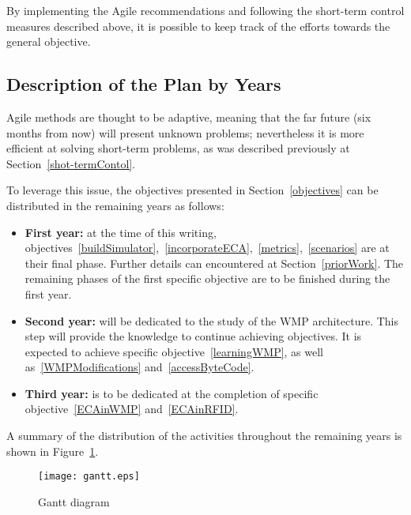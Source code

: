 By implementing the Agile recommendations and following the short-term control measures described above, it is possible to keep track of the efforts towards the general objective.

\subsection{Description of the Plan by Years}
Agile methods are thought to be adaptive, meaning that the far future (six months from now) will present unknown problems; nevertheless it is more efficient at solving short-term problems, as was described previously at Section~\ref{shot-termContol}.

To leverage this issue, the objectives presented in Section~\ref{objectives} can be distributed in the remaining years as follows:

\begin{itemize}
	\item {\bfseries First year:} at the time of this writing, objectives~\ref{buildSimulator},~\ref{incorporateECA},~\ref{metrics},~\ref{scenarios} are at their final phase. Further details can encountered at Section~\ref{priorWork}. The remaining phases of the first specific objective are to be finished during the first year.
	\item {\bfseries Second year:} will be dedicated to the study of the WMP architecture. This step will provide the knowledge to continue achieving objectives. It is expected to achieve specific objective~\ref{learningWMP}, as well as~\ref{WMPModifications} and~\ref{accessByteCode}.
	\item {\bfseries Third year:} is to be dedicated at the completion of specific objective~\ref{ECAinWMP} and~\ref{ECAinRFID}.
\end{itemize}

A summary of the distribution of the activities throughout the remaining years is shown in Figure~\ref{fig:gantt}.

\begin{figure}[htbp]
  \centering
  \texttt{[image: gantt.eps]}
  \caption{Gantt diagram
  \label{fig:gantt}}
\end{figure}